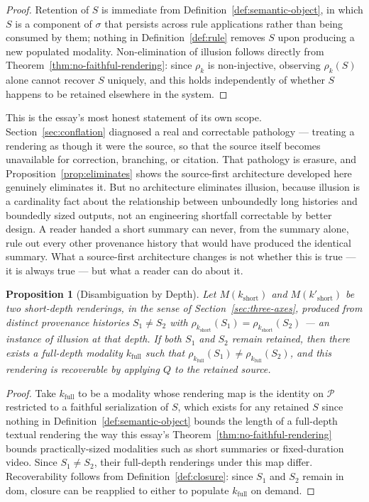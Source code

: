 \documentclass[11pt]{article}
\newtheorem{proposition}[theorem]{Proposition}
\theoremstyle{definition}
\begin{document}
\begin{proof}
Retention of $S$ is immediate from Definition~\ref{def:semantic-object}, in which $S$ is a component of $\sigma$ that persists across rule applications rather than being consumed by them; nothing in Definition~\ref{def:rule} removes $S$ upon producing a new populated modality. Non-elimination of illusion follows directly from Theorem~\ref{thm:no-faithful-rendering}: since $\rho_k$ is non-injective, observing $\rho_k(S)$ alone cannot recover $S$ uniquely, and this holds independently of whether $S$ happens to be retained elsewhere in the system.
\end{proof}

This is the essay's most honest statement of its own scope. Section~\ref{sec:conflation} diagnosed a real and correctable pathology --- treating a rendering as though it were the source, so that the source itself becomes unavailable for correction, branching, or citation. That pathology is erasure, and Proposition~\ref{prop:eliminates} shows the source-first architecture developed here genuinely eliminates it. But no architecture eliminates illusion, because illusion is a cardinality fact about the relationship between unboundedly long histories and boundedly sized outputs, not an engineering shortfall correctable by better design. A reader handed a short summary can never, from the summary alone, rule out every other provenance history that would have produced the identical summary. What a source-first architecture changes is not whether this is true --- it is always true --- but what a reader can do about it.

\begin{proposition}[Disambiguation by Depth]
\label{prop:disambiguation-depth}
Let $M(k_{\mathrm{short}})$ and $M(k'_{\mathrm{short}})$ be two short-depth renderings, in the sense of Section~\ref{sec:three-axes}, produced from distinct provenance histories $S_1 \neq S_2$ with $\rho_{k_{\mathrm{short}}}(S_1) = \rho_{k_{\mathrm{short}}}(S_2)$ --- an instance of illusion at that depth. If both $S_1$ and $S_2$ remain retained, then there exists a full-depth modality $k_{\mathrm{full}}$ such that $\rho_{k_{\mathrm{full}}}(S_1) \neq \rho_{k_{\mathrm{full}}}(S_2)$, and this rendering is recoverable by applying $Q$ to the retained source.
\end{proposition}

\begin{proof}
Take $k_{\mathrm{full}}$ to be a modality whose rendering map is the identity on $\mathcal{P}$ restricted to a faithful serialization of $S$, which exists for any retained $S$ since nothing in Definition~\ref{def:semantic-object} bounds the length of a full-depth textual rendering the way this essay's Theorem~\ref{thm:no-faithful-rendering} bounds practically-sized modalities such as short summaries or fixed-duration video. Since $S_1 \neq S_2$, their full-depth renderings under this map differ. Recoverability follows from Definition~\ref{def:closure}: since $S_1$ and $S_2$ remain in $\mathrm{dom}$, closure can be reapplied to either to populate $k_{\mathrm{full}}$ on demand.
\end{proof}
\end{document}
